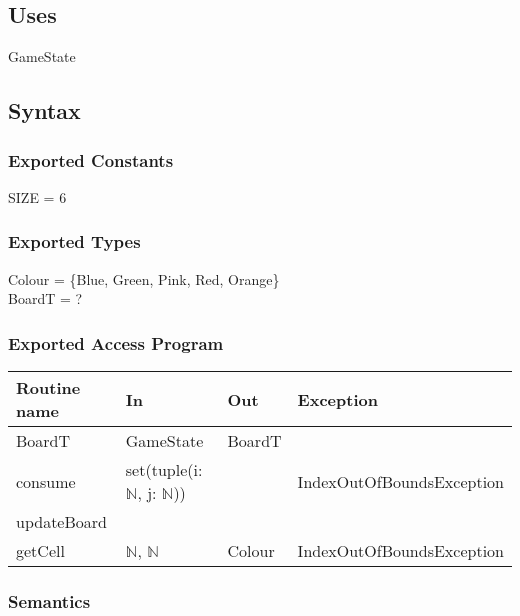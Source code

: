 \documentclass[11pt]{article}
\begin{document}
\subsection*{Uses}
\label{sec:org44b7c9f}
GameState

\subsection*{Syntax}
\label{sec:org2bef26d}

\subsubsection*{Exported Constants}
\label{sec:orgf6e7c76}
SIZE = 6

\subsubsection*{Exported Types}
\label{sec:org07b4c38}

Colour = \{Blue, Green, Pink, Red, Orange\}\\
BoardT = ?

\subsubsection*{Exported Access Program}
\label{sec:org6fef805}
\begin{center}
\begin{tabular}{l|l|l|l}
Routine name & In & Out & Exception\\
\hline
BoardT & GameState & BoardT & \\
consume & set(tuple(i: \(\mathbb{N}\), j: \(\mathbb{N}\))) &  & IndexOutOfBoundsException\\
updateBoard &  &  & \\
getCell & \(\mathbb{N}\), \(\mathbb{N}\) & Colour & IndexOutOfBoundsException\\
\end{tabular}
\end{center}

\subsubsection*{Semantics}
\label{sec:orgaef5fbb}
\end{document}
